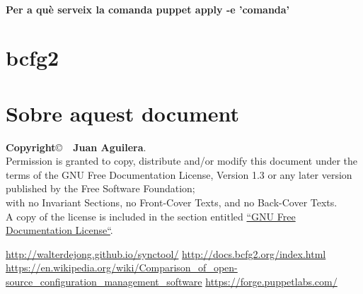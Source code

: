 \documentclass[a4paper]{article}
\begin{document}
\paragraph{Per a què serveix la comanda puppet apply -e '\<comanda\>' \\}
\section{bcfg2}\cite{BCFG2}

\section{Sobre aquest document}
\textbf{Copyright}\copyright\ \textbf{\the\year\ Juan Aguilera}.\\
Permission is granted to copy, distribute and/or modify this document under the terms of the GNU Free Documentation License, Version 1.3 or any later version published by the Free Software Foundation;\\
with no Invariant Sections, no Front-Cover Texts, and no Back-Cover Texts.\\
A copy of the license is included in the section entitled \href{http://www.gnu.org/licenses/fdl.html}{``GNU Free Documentation License``}.

\begin{thebibliography}{99}
	 \url{http://walterdejong.github.io/synctool/}
	 \url{http://docs.bcfg2.org/index.html}
	 \url{https://en.wikipedia.org/wiki/Comparison_of_open-source_configuration_management_software}
	 \url{https://forge.puppetlabs.com/} 
\end{thebibliography}
\end{document}

